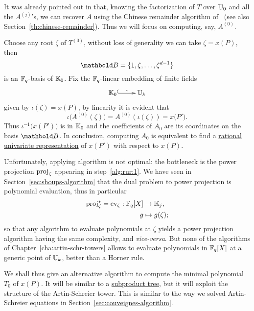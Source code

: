 It was already pointed out in \cite[$\S$2.3]{couveignes96} that,
knowing the factorization of $T$ over $\mathbb{U}_0$ and all the $A^{(j)}$'s,
we can recover $A$ using the Chinese remainder algorithm
of~\cite[$\S10$]{vzGG} (see also
Section~\ref{th:chinese-remainder}). Thus we will focus on computing,
say, $A^{(0)}$.

Choose any root $\zeta$ of $T^{(0)}$, without loss of generality we
can take $\zeta=x(P)$, then
\begin{equation}
  \label{eq:188}
  \basis{B}=\{1,\zeta,\ldots,\zeta^{d-1}\}  
\end{equation}
is an $\mathbb{F}_q$-basis of $\mathbb{K}_0$.  Fix the $\mathbb{F}_q$-linear embedding of
finite fields
\begin{equation}
  \label{eq:embed}
  \xymatrix{
    \K_0 \ar@{^{(}->}[r]^-\iota & \U_k
  }
\end{equation}
given by $\iota(\zeta) = x(P)$, by linearity it is evident that
\begin{equation}
  \iota\bigl(A^{(0)}(\zeta)\bigr) = A^{(0)}\left(\iota(\zeta)\right)=x\bigl(P'\bigr)
  \text{.}
\end{equation}
Thus $\iota^{-1}\bigl(x(P')\bigr)$ is in $\mathbb{K}_0$ and the coefficients
of $A_0$ are its coordinates on the basis $\basis{B}$. In conclusion,
computing $A_0$ is equivalent to find a \hyperref[eq:22]{rational
  univariate representation} of $x(P')$ with respect to $x(P)$.

Unfortunately, applying algorithm \hyperref[alg:rur]{} is not optimal: the
bottleneck is the power projection $\operatorname{proj}_\zeta$ appearing in
step~\ref{alg:rur:1}. We have seen in
Section~\ref{sec:shoups-algorithm} that the dual problem to power
projection is polynomial evaluation, thus in particular
\begin{equation}
  \label{eq:189}
  \begin{aligned}
    \operatorname{proj}_\zeta^\ast = \operatorname{ev}_\zeta : \mathbb{F}_q[X] &\rightarrow \mathbb{K}_j\text{,}\\
    g &\mapsto g(\zeta)\text{;}
  \end{aligned}
\end{equation}
so that any algorithm to evaluate polynomials at $\zeta$ yields a
power projection algorithm having the same complexity, and
\emph{vice-versa}. But none of the algorithms of
Chapter~\ref{cha:artin-schr-towers} allows to evaluate polynomials in
$\mathbb{F}_q[X]$ at a generic point of $\mathbb{U}_k$, better than a Horner rule.

We shall thus give an alternative algorithm to compute the minimal
polynomial $T_0$ of $x(P)$. It will be similar to a
\hyperref[sec:chin-rema-algor]{subproduct tree}, but it will exploit
the structure of the Artin-Schreier tower. This is similar to the way
we solved Artin-Schreier equations in
Section~\ref{sec:couveignes-algorithm}.


